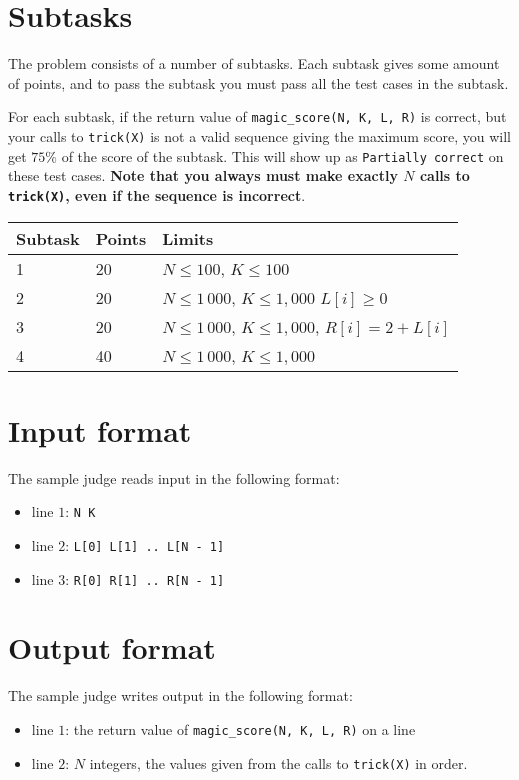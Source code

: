 \section*{Subtasks}
The problem consists of a number of subtasks. Each subtask gives some amount of points, and to pass
the subtask you must pass all the test cases in the subtask.

For each subtask, if the return value of \texttt{magic\_score(N, K, L, R)} is correct, but your calls to \texttt{trick(X)}
is not a valid sequence giving the maximum score, you will get $75\%$ of the score of the subtask. This will show up as
\texttt{Partially correct} on these test cases. \textbf{Note that you always must make exactly $N$ calls to \texttt{trick(X)},
even if the sequence is incorrect}.

\begin{tabular}{|l|l|l|}
  \hline
  \textbf{Subtask} & \textbf{Points} & \textbf{Limits} \\ \hline
  1 & 20 & $N \le 100$, $K \le 100$ \\ \hline
  2 & 20 & $N \le 1\,000$, $K \le 1,000$ $L[i] \ge 0$\\ \hline
  3 & 20 & $N \le 1\,000$, $K \le 1,000$, $R[i] = 2 + L[i]$ \\ \hline
  4 & 40 & $N \le 1\,000$, $K \le 1,000$ \\ \hline
\end{tabular}

\section*{Input format}
The sample judge reads input in the following format:

\begin{itemize}
  \item line $1$: \texttt{N K}
  \item line $2$: \texttt{L[0] L[1] .. L[N - 1]}
  \item line $3$: \texttt{R[0] R[1] .. R[N - 1]}
\end{itemize}

\section*{Output format}
The sample judge writes output in the following format:

\begin{itemize}
  \item line $1$: the return value of \texttt{magic\_score(N, K, L, R)} on a line
  \item line $2$: $N$ integers, the values given from the calls to \texttt{trick(X)} in order.
\end{itemize}

